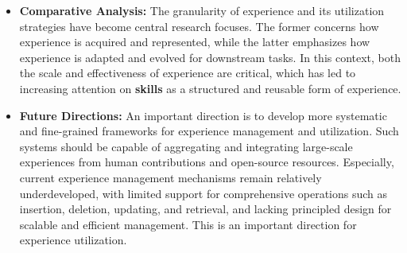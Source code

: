 \begin{tcolorbox}[takeaway,title={Takeaway 6.1}]
\begin{itemize}
\item \textbf{Comparative Analysis:} The granularity of experience and its utilization strategies have become central research focuses. The former concerns how experience is acquired and represented, while the latter emphasizes how experience is adapted and evolved for downstream tasks. 
In this context, both the scale and effectiveness of experience are critical, which has led to increasing attention on \textbf{skills} as a structured and reusable form of experience. 

\item \textbf{Future Directions:} An important direction is to develop more systematic and fine-grained frameworks for experience management and utilization. Such systems should be capable of aggregating and integrating large-scale experiences from human contributions and open-source resources. 
Especially, current experience management mechanisms remain relatively underdeveloped, with limited support for comprehensive operations such as insertion, deletion, updating, and retrieval, and lacking principled design for scalable and efficient management. This is an important direction for experience utilization.
\end{itemize}
\end{tcolorbox}








